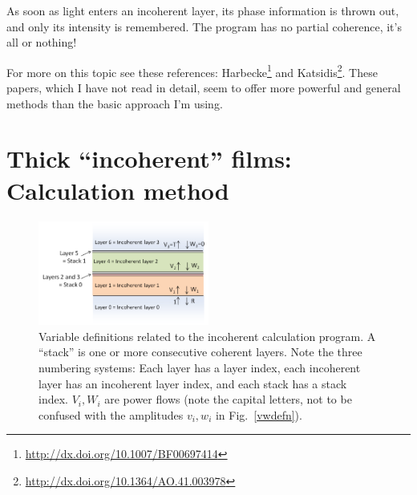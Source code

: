 \documentclass[12pt]{article}
\renewcommand{\(}{\left(}
\renewcommand{\)}{\right)}
\begin{document}
As soon as light enters an incoherent layer, its phase information is thrown out, and only its intensity is remembered. The program has no partial coherence, it's all or nothing!

For more on this topic see these references: Harbecke\footnote{\url{http://dx.doi.org/10.1007/BF00697414}} and Katsidis\footnote{\url{http://dx.doi.org/10.1364/AO.41.003978}}. These papers, which I have not read in detail, seem to offer more powerful and general methods than the basic approach I'm using.

\section{Thick ``incoherent'' films: Calculation method}

\begin{figure}[htb]
\centering
\includegraphics[width=0.5\textwidth]{incoherentfig.png}
\caption{Variable definitions related to the incoherent calculation program. A ``stack'' is one or more consecutive coherent layers. Note the three numbering systems: Each layer has a layer index, each incoherent layer has an incoherent layer index, and each stack has a stack index. $V_i,W_i$ are power flows (note the capital letters, not to be confused with the amplitudes $v_i,w_i$ in Fig.~\ref{vwdefn}).\label{incoherentfig}}
\end{figure}
\end{document}
